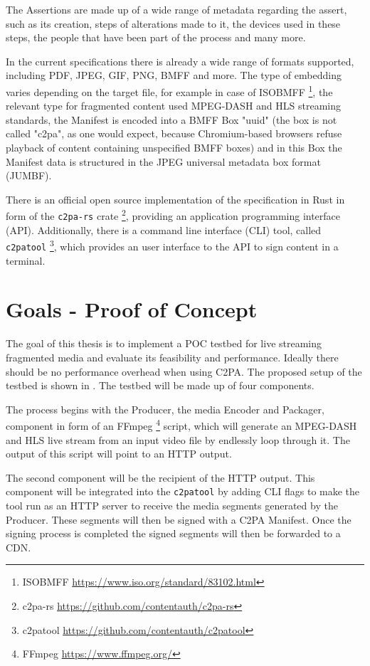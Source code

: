 \documentclass[a4paper]{article}
\begin{document}
The Assertions are made up of a wide range of metadata regarding the assert, such as its creation, steps of alterations made to it, the devices used in these steps, the people that have been part of the process and many more.

In the current specifications there is already a wide range of formats supported, including PDF, JPEG, GIF, PNG, BMFF and more. The type of embedding varies depending on the target file, for example in case of ISOBMFF \footnote{ISOBMFF \url{https://www.iso.org/standard/83102.html}}, the relevant type for fragmented content used MPEG-DASH and HLS streaming standards, the Manifest is encoded into a BMFF Box "uuid" (the box is not called "c2pa", as one would expect, because Chromium-based browsers refuse playback of content containing unspecified BMFF boxes) and in this Box the Manifest data is structured in the JPEG universal metadata box format (JUMBF).

There is an official open source implementation of the specification in Rust in form of the \texttt{c2pa-rs} crate \footnote{c2pa-rs \url{https://github.com/contentauth/c2pa-rs}}, providing an application programming interface (API). Additionally, there is a command line interface (CLI) tool, called \texttt{c2patool} \footnote{c2patool \url{https://github.com/contentauth/c2patool}}, which provides an user interface to the API to sign content in a terminal.

\section{Goals - Proof of Concept}

The goal of this thesis is to implement a POC testbed for live streaming fragmented media and evaluate its feasibility and performance. Ideally there should be no performance overhead when using C2PA. The proposed setup of the testbed is shown in . The testbed will be made up of four components. 

The process begins with the Producer, the media Encoder and Packager, component in form of an FFmpeg \footnote{FFmpeg \url{https://www.ffmpeg.org/}} script, which will generate an MPEG-DASH and HLS live stream from an input video file by endlessly loop through it. The output of this script will point to an HTTP output.

The second component will be the recipient of the HTTP output. This component will be integrated into the \texttt{c2patool} by adding CLI flags to make the tool run as an HTTP server to receive the media segments generated by the Producer. These segments will then be signed with a C2PA Manifest. Once the signing process is completed the signed segments will then be forwarded to a CDN.
\end{document}
